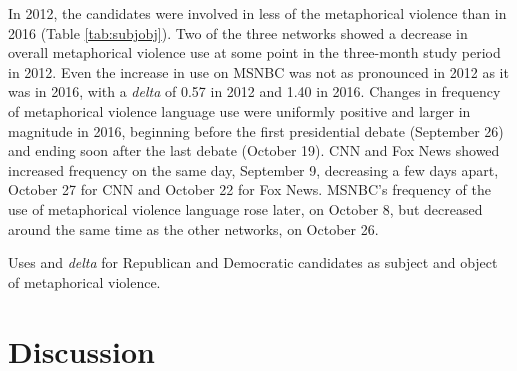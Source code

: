 In 2012, the candidates were involved in less of the metaphorical violence than
in 2016 (Table \ref{tab:subjobj}). Two of the three networks showed a decrease in overall metaphorical
violence use at some point in the three-month study period in 2012. Even the
increase in use on MSNBC was not as pronounced in 2012 as it was in 2016, with a
\emph{delta} of  0.57 in 2012 and 1.40 in 2016. Changes in frequency of
metaphorical violence language use were uniformly positive and larger in
magnitude in 2016, beginning before the first presidential debate (September 26)
and ending soon after the last debate (October 19). CNN and Fox News showed
increased frequency on the same day, September 9, decreasing a few days apart,
October 27 for CNN and October 22 for Fox News. MSNBC's frequency of the use of
metaphorical violence language rose later, on October 8, but decreased around
the same time as the other networks, on October 26. 

\begin{table}
  \centering
  \begin{subtable}{\linewidth}
    \centering
    
    \caption{}
    \label{tab:subjobj-2012}
  \end{subtable}
  

  \begin{subtable}{\linewidth}
    \centering
    
    \caption{}
    \label{tab:subjobj-2016}
  \end{subtable}

  \caption{Uses and \emph{delta} for Republican and Democratic candidates as
  subject and object of metaphorical violence.}
  \label{tab:subjobj}
\end{table}


\section{Discussion}

